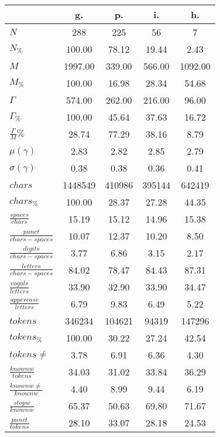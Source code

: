 \begin{table}[h!]
\begin{center}
\begin{tabular}{| l || c | c | c | c |}\hline
 & {\bf g.} & {\bf p.} & {\bf i.} & {\bf h.} \\\hline\hline
$N$ & 288  & 225  & 56  & 7 \\
$N_{\%}$ & 100.00  & 78.12  & 19.44  & 2.43 \\\hline
$M$ & 1997.00  & 339.00  & 566.00  & 1092.00 \\
$M_{\%}$ & 100.00  & 16.98  & 28.34  & 54.68 \\\hline
$\Gamma$ & 574.00  & 262.00  & 216.00  & 96.00 \\
$\Gamma_{\%}$ & 100.00  & 45.64  & 37.63  & 16.72 \\\hline
$\frac{\Gamma}{M}\%$ & 28.74  & 77.29  & 38.16  & 8.79 \\
$\mu(\gamma)$ & 2.83  & 2.82  & 2.85  & 2.79 \\
$\sigma(\gamma)$ & 0.38  & 0.38  & 0.36  & 0.41 \\\hline\hline
$chars$ & 1448549  & 410986  & 395144  & 642419 \\
$chars_{\%}$ & 100.00  & 28.37  & 27.28  & 44.35 \\\hline
$\frac{spaces}{chars}$ & 15.19  & 15.12  & 14.96  & 15.38 \\
$\frac{punct}{chars-spaces}$ & 10.07  & 12.37  & 10.20  & 8.50 \\
$\frac{digits}{chars-spaces}$ & 3.77  & 6.86  & 3.15  & 2.17 \\\hline
$\frac{letters}{chars-spaces}$ & 84.02  & 78.47  & 84.43  & 87.31 \\
$\frac{vogals}{letters}$ & 33.90  & 32.90  & 33.90  & 34.47 \\
$\frac{uppercase}{letters}$ & 6.79  & 9.83  & 6.49  & 5.22 \\\hline\hline
$tokens$ & 346234  & 104621  & 94319  & 147296 \\
$tokens_{\%}$ & 100.00  & 30.22  & 27.24  & 42.54 \\
$tokens \neq$ & 3.78  & 6.91  & 6.36  & 4.30 \\\hline
$\frac{knownw}{tokens}$ & 34.03  & 31.02  & 33.84  & 36.29 \\
$\frac{knownw \neq}{knownw}$ & 4.40  & 8.99  & 9.44  & 6.19 \\\hline
$\frac{stopw}{knownw}$ & 65.37  & 50.63  & 69.80  & 71.67 \\
$\frac{punct}{tokens}$ & 28.10  & 33.07  & 28.18  & 24.53 \\

\end{tabular}
\end{center}
\end{table}
